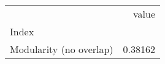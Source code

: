 \begin{tabular}{lr}
\toprule
{} &    value \\
Index                   &          \\
\midrule
Modularity (no overlap) &  0.38162 \\
\bottomrule
\end{tabular}

